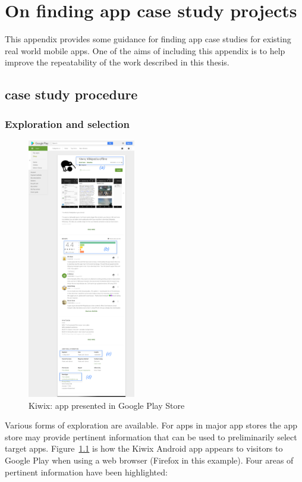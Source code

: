 \chapter{On finding app case study projects}
This appendix provides some guidance for finding app case studies for existing real world mobile apps. One of the aims of including this appendix is to help improve the repeatability of the work described in this thesis.

\section{case study procedure}
\subsection{Exploration and selection}
\begin{figure}
  \begin{center}
    \includegraphics[width=0.42\textwidth]{images/google-play/annotated-resized40pct-2021-09-30-kiwix-app-on-google.png}
  \end{center}
  \caption{Kiwix: app presented in Google Play Store}
  \label{fig:gp-kiwix-app}
\end{figure}

Various forms of exploration are available. For apps in major app stores the app store may provide pertinent information that can be used to preliminarily select target apps. Figure~\ref{fig:gp-kiwix-app} is how the Kiwix Android app appears to visitors to Google Play when using a web browser (Firefox in this example). Four areas of pertinent information have been highlighted:

